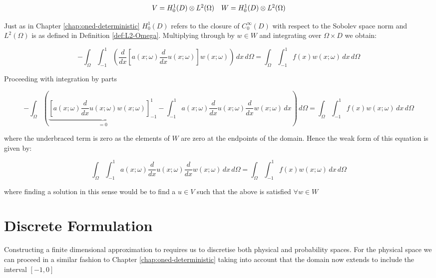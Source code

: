 \begin{equation}
    \begin{array}{c c}
        V = H^1_0(D) \otimes L^2(\Omega) &
        W = H^1_0(D) \otimes L^2(\Omega)
    \end{array}
\end{equation}

Just as in Chapter \ref{chap:oned-deterministic} $H^1_0(D)$ refers to the
closure of $C_0^\infty(D)$ with respect to the Sobolev space norm
 and $L^2(\Omega)$ is as defined in Definition
\ref{def:L2-Omega}. Multiplying through by $w \in W$ and integrating over
$\Omega \times D$ we obtain:

\begin{equation}
    -\int_{\Omega}\int_{-1}^1\left(\frac{d}{dx}\left[a(x;\omega)\frac{d}{dx}u(x;\omega)\right]
    w(x;\omega)\right)\, dx\, d\Omega = \int_{\Omega}\int_{-1}^1 f(x)w(x;\omega)\, dx\, d\Omega
\end{equation}

Proceeding with integration by parts

\begin{equation}
    -\int_{\Omega}\left(
      \underbrace{\left[a(x;\omega)\frac{d}{dx}u(x;\omega)
                        w(x;\omega)\right]_{-1}^1}_{= 0}
       -\int_{-1}^1a(x;\omega)\frac{d}{dx}u(x;\omega)\frac{d}{dx}w(x;\omega)\, dx
    \right)\, d\Omega = \int_{\Omega}\int_{-1}^1 f(x)w(x;\omega)\, dx\, d\Omega
\end{equation}

where the underbraced term is zero as the elements of $W$ are zero at the
endpoints of the domain. Hence the weak form of this equation is given by:

\begin{equation}\label{eq:wk-one-d-stochastic}
    \int_{\Omega}\int_{-1}^1a(x;\omega)
           \frac{d}{dx}u(x;\omega)\frac{d}{dx}w(x;\omega)\, dx\, d\Omega =
           \int_{\Omega}\int_{-1}^1 f(x)w(x;\omega)\, dx\, d\Omega
\end{equation}

where finding a solution in this sense would be to find a $u \in V$ such that
the above is satisfied $\forall w \in W$

\section{Discrete Formulation}

Constructing a finite dimensional approximation to
 requires us to discretise both physical and
probability spaces. For the physical space we can proceed in a similar fashion
to Chapter \ref{chap:oned-deterministic} taking into account that the domain
now extends to include the interval $[-1, 0]$

